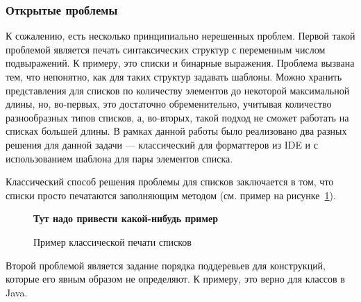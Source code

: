 \begin{table}[h!]
	\centering



	\caption{Время форматирования файлов (в секундах)}
	\label{tbl:pluginPerformanceTbl}
\end{table}

\subsubsection{Открытые проблемы}

К сожалению, есть несколько принципиально нерешенных проблем. Первой такой
проблемой является печать синтаксических структур с переменным числом
подвыражений. К примеру, это списки и бинарные выражения. Проблема вызвана
тем, что непонятно, как для таких структур задавать шаблоны. Можно хранить
представления для списков по количеству элементов
до некоторой максимальной длины, но,
во-первых, это достаточно обременительно, учитывая количество разнообразных
типов списков, а, во-вторых, такой подход не сможет работать на списках большей
длины. В рамках данной работы было реализовано два разных решения для данной
задачи --- классический для форматтеров из IDE и с использованием шаблона для
пары элементов списка.

Классический способ решения проблемы для списков заключается в том, что
списки просто печатаются заполняющим методом (см. пример на
рисунке~\ref{fig:listClassicEx}).

\begin{figure}[h!]
  \textbf{Тут надо привести какой-нибудь пример}

  \caption{Пример классической печати списков}
  \label{fig:listClassicEx}
\end{figure}


Второй проблемой является задание порядка поддеревьев для конструкций, которые
его явным образом не определяют. К примеру, это верно для классов в Java.
